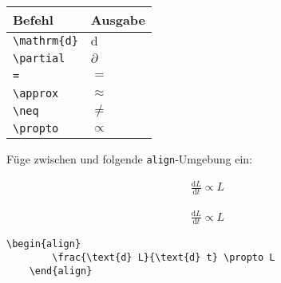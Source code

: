 \documentclass["WS\space 16-17\space -\space LaTeX-Kurs\space -\space Praesentation\space -\space 1.tex"]{subfiles}
\begin{document}
\begin{frame}[fragile]
	\begin{center}
		\begin{tabular}{ll}
			\toprule
			Befehl							&	Ausgabe					\\ \midrule
			\lstinline|\mathrm{d}|		&	$\mathrm{d}$		\\
			\lstinline|\partial|		&	$\partial$		
			\\
			\lstinline|=|		&	$=$		
      \\
			\lstinline|\approx|		&	$\approx$		
			\\
			\lstinline|\neq|					&	$\neq$		\\
      \lstinline|\propto|					&	$\propto$		\\
			\bottomrule
		\end{tabular}
	\end{center}
	\pause\btVFill
	\Aufgabee
	Füge zwischen  und  folgende \lstinline[basicstyle=\normalfont\normalsize]|align|-Umgebung ein:
	\begin{outputbox}
	    \begin{align}
	        \frac{\text{d} L}{\text{d} t} \propto L 
	    \end{align}	
    \end{outputbox}
	\vspace{0.3cm}
\end{frame}
\begin{frame}[fragile]
	\Losung
	\begin{outputbox}
    \begin{align}
      \frac{\text{d} L}{\text{d} t} \propto L 
    \end{align}
	\end{outputbox}

	\Code
	\begin{lstlisting}[gobble=4]
    \begin{align}
        \frac{\text{d} L}{\text{d} t} \propto L 
    \end{align}
	\end{lstlisting}
\end{frame}
\end{document}
